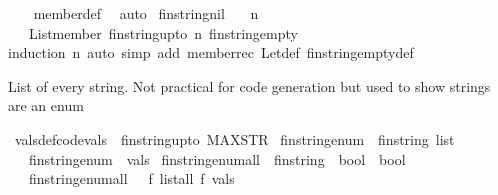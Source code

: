 \begin{isabellebody}
%
\isadelimproof
\ \ %
\endisadelimproof
%
\isatagproof
{}\isamarkupfalse%
\ member{\isacharunderscore}def\ \isamarkupfalse%
\ auto%
\endisatagproof
{\isafoldproof}%
%
\isadelimproof
\isanewline
%
\endisadelimproof
\isanewline
{}\isamarkupfalse%
\ fin{\isacharunderscore}string{\isacharunderscore}nil{\isacharcolon}\isanewline
\ \ \ n\isanewline
\ \ \ {\isachardoublequoteopen}List{\isachardot}member\ {\isacharparenleft}fin{\isacharunderscore}string{\isacharunderscore}upto\ n{\isacharparenright}\ fin{\isacharunderscore}string{\isacharunderscore}empty{\isachardoublequoteclose}\isanewline
%
\isadelimproof
\ \ %
\endisadelimproof
%
\isatagproof
{}\isamarkupfalse%
{\isacharparenleft}induction\ n{\isacharcomma}\ auto\ simp\ add{\isacharcolon}\ member{\isacharunderscore}rec\ Let{\isacharunderscore}def\ fin{\isacharunderscore}string{\isacharunderscore}empty{\isacharunderscore}def{\isacharparenright}%
\endisatagproof
{\isafoldproof}%
%
\isadelimproof
%
\endisadelimproof
%
\begin{isamarkuptext}%
List of every string. Not practical for code generation but used to show strings are an enum%
\end{isamarkuptext}\isamarkuptrue%
\isamarkupfalse%
\ vals{\isacharunderscore}def{\isacharbrackleft}code{\isacharbrackright}{\isacharcolon}{\isachardoublequoteopen}vals\ {\isasymequiv}\ fin{\isacharunderscore}string{\isacharunderscore}upto\ MAX{\isacharunderscore}STR{\isachardoublequoteclose}\isanewline
\isanewline
{}\isamarkupfalse%
\ fin{\isacharunderscore}string{\isacharunderscore}enum\ {\isacharcolon}{\isacharcolon}\ {\isachardoublequoteopen}fin{\isacharunderscore}string\ list{\isachardoublequoteclose}\ \isanewline
\ \ \ {\isachardoublequoteopen}fin{\isacharunderscore}string{\isacharunderscore}enum\ {\isacharequal}\ vals{\isachardoublequoteclose}\isanewline
{}\isamarkupfalse%
\ fin{\isacharunderscore}string{\isacharunderscore}enum{\isacharunderscore}all\ {\isacharcolon}{\isacharcolon}\ {\isachardoublequoteopen}{\isacharparenleft}fin{\isacharunderscore}string\ {\isasymRightarrow}\ bool{\isacharparenright}\ {\isasymRightarrow}\ bool{\isachardoublequoteclose}\isanewline
\ \ \ {\isachardoublequoteopen}fin{\isacharunderscore}string{\isacharunderscore}enum{\isacharunderscore}all\ {\isacharequal}\ {\isacharparenleft}{\isasymlambda}\ f{\isachardot}\ list{\isacharunderscore}all\ f\ vals{\isacharparenright}{\isachardoublequoteclose}\isanewline

\end{isabellebody}
